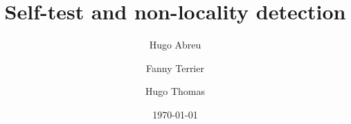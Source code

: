 

\title{Self-test and non-locality detection}

\author[$\dag$]{Hugo Abreu}
\author[$\dag$]{Fanny Terrier}
\author[$\dag$]{Hugo Thomas}

\date{\today}


\maketitle
\thispagestyle{firststyle}













